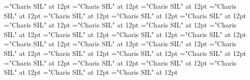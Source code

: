 \documentclass[a4paper]{article}
\begin{document}
\pagestyle{plain}
\sloppy
\setlength{\parfillskip}{0pt plus 1fil}
\font{}="Charis SIL" at 12pt
\font{}="Charis SIL" at 12pt
\font{}="Charis SIL" at 12pt
\font\entryletDatadicBody="Charis SIL" at 12pt
\font\headwordsehentryletDatadicBody="Charis SIL" at 12pt
\font\xhomographnumberptheadwordsehentryletDatadicBody="Charis SIL" at 12pt
\font\sensesentryletDatadicBody="Charis SIL" at 12pt
\font\sensesensesentryletDatadicBody="Charis SIL" at 12pt
\font\xsensenumberLcensensesensesentryletDatadicBody="Charis SIL" at 12pt
\font\grammaticalinfosensesensesentryletDatadicBody="Charis SIL" at 12pt
\font\partofspeechptgrammaticalinfosensesensesentryletDatadicBody="Charis SIL" at 12pt
\font\slotsgrammaticalinfosensesensesentryletDatadicBody="Charis SIL" at 12pt
\font\xitemslotsgrammaticalinfosensesensesentryletDatadicBody="Charis SIL" at 12pt
\font\slotnameptxitemslotsgrammaticalinfosensesensesentryletDatadicBody="Charis SIL" at 12pt
\font{}="Charis SIL" at 12pt
\font\xitemptdefinitionLbptsensesensesentryletDatadicBody="Charis SIL" at 12pt
\font\xlanguagetagenxitemptdefinitionLbptsensesensesentryletDatadicBody="Charis SIL" at 12pt
\font\xitemendefinitionLbptsensesensesentryletDatadicBody="Charis SIL" at 12pt
\font\xlanguagetagenxitemendefinitionLbptsensesensesentryletDatadicBody="Charis SIL" at 12pt
\font\slotnameptslotsgrammaticalinfosensesensesentryletDatadicBody="Charis SIL" at 12pt
\font\relationantonymptsensesensesentryletDatadicBody="Charis SIL" at 12pt
\font\relationantonymbeforesensesensesentryletDatadicBody="Charis SIL" at 12pt
\font\xitemptrelationantonymptsensesensesentryletDatadicBody="Charis SIL" at 12pt
\font\xlanguagetagenxitemptrelationantonymptsensesensesentryletDatadicBody="Charis SIL" at 12pt
\font\xitemenrelationantonymptsensesensesentryletDatadicBody="Charis SIL" at 12pt
\font\xlanguagetagenxitemenrelationantonymptsensesensesentryletDatadicBody="Charis SIL" at 12pt
\font\xsensenumberLbensensesensesentryletDatadicBody="Charis SIL" at 12pt

\pagestyle{fancy} 

\end{document}
